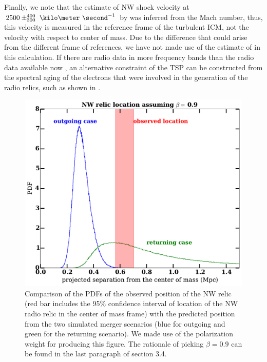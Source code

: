 \documentclass[letterpaper,useAMS,usenatbib]{mn2e}
\begin{document}
\par 
Finally, we note that the estimate of NW shock velocity at $2500
\pm^{400}_{300}~\kilo\meter~\second^{-1}$ by \cite{L13} was inferred from
the Mach number, thus, this velocity is measured in the reference frame of
the turbulent ICM, not the velocity with respect to center of
mass. Due to the difference that could arise from the different frame of
references, we have not made use of the estimate of \cite{L13} in this
calculation. If there are radio data in more frequency bands than
the radio data available now \citep{L13}, an alternative constraint of the
TSP can be constructed from the spectral aging of the electrons that were involved in the generation of the
radio relics, such as shown in \citet{Stroe14}. \par
\begin{figure}
	\includegraphics[width=\linewidth]{our_guess.pdf}
	\caption{Comparison of the PDFs of the observed position of the NW relic (red bar
		includes the 95\% confidence interval of location of the NW radio relic in the center of mass frame) with the predicted position from the two simulated merger
		scenarios (blue for outgoing and green for the returning scenario).
	We made use of the polarization weight for producing this figure.
	The
rationale of picking $\beta = 0.9$ can be found in the last paragraph of
section 3.4.} 
	\label{fig:our_guessed_scenario}
\end{figure}
\end{document}
